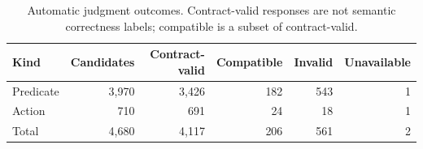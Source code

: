 \begin{table}[htbp]
\centering\small
\caption{Automatic judgment outcomes. Contract-valid responses are not semantic correctness labels; compatible is a subset of contract-valid.}
\label{tab:judgments}
\begin{tabular}{lrrrrr}
\toprule
Kind & Candidates & Contract-valid & Compatible & Invalid & Unavailable \\
\midrule
Predicate & 3,970 & 3,426 & 182 & 543 & 1 \\
Action & 710 & 691 & 24 & 18 & 1 \\
Total & 4,680 & 4,117 & 206 & 561 & 2 \\
\bottomrule
\end{tabular}
\end{table}
